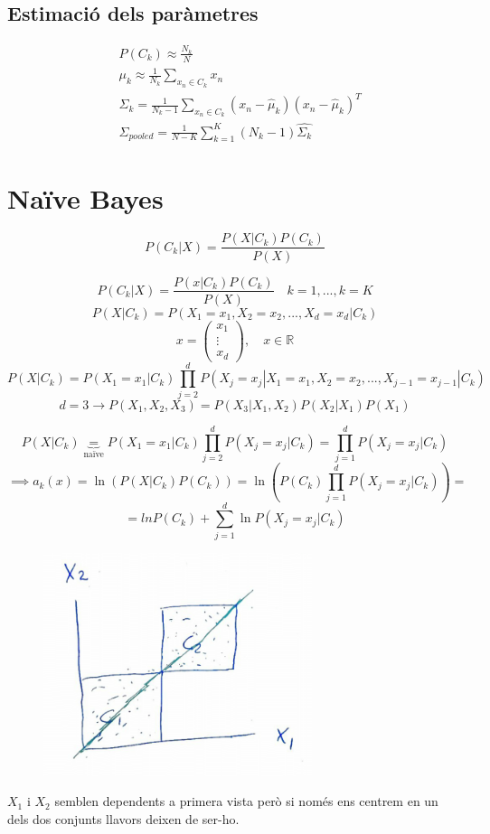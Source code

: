 \documentclass[a4paper]{article}
\begin{document}
\subsection{Estimació dels paràmetres}

\begin{align*}
&	P(C_k) \approx \frac{N_k}{N} \\
&	\mu_k \approx \frac{1}{N_k} \sum_{x_n \in C_k} x_n \\
&	\Sigma_k = \frac{1}{N_k - 1} \sum_{x_n \in C_k} (x_n - \hat{\mu}_k)(x_n - \hat{\mu}_k)^T \\
&	\Sigma_{pooled} = \frac{1}{N - K} \sum_{k=1}^K (N_k - 1) \hat{\Sigma_k}
\end{align*}

\section{Naïve Bayes}
$$
P(C_k|X) = \frac{P(X|C_k)P(C_k)}{P(X)}
$$


$$
P(C_k|X) = \frac{P(x|C_k)P(C_k)}{P(X)} \quad k=1,...,k=K
$$
$$
P(X|C_k) = P(X_1=x_1, X_2=x_2, ..., X_d = x_d|C_k)
$$
$$
x = 
\begin{pmatrix}
x_1 \\ \vdots \\ x_d
\end{pmatrix}, \quad
x \in \mathbb{R}
$$
$$
P(X|C_k) = P(X_1=x_1|C_k)\prod_{j=2}^d P(X_j=x_j|X_1=x_1,X_2=x_2,...,X_{j-1}=x_{j-1}|C_k)
$$
$$
d=3 \rightarrow P(X_1,X_2,X_3) = P(X_3|X_1,X_2)P(X_2|X_1)P(X_1)
$$

$$
P(X|C_k) \underbrace{=}_{\text{naïve}} P(X_1=x_1|C_k) 
\prod_{j=2}^d P(X_j=x_j|C_k) = \prod_{j=1}^d P(X_j=x_j|C_k)
$$
$$
\implies a_k(x) = \ln(P(X|C_k)P(C_k)) = 
\ln\left(P(C_k)\prod_{j=1}^d P(X_j=x_j|C_k)\right) =
$$
$$
= ln P(C_k) + \sum_{j=1}^d \ln P(X_j=x_j|C_k)
$$

\begin{figure}[H]
	\centering
	\includegraphics[width=0.7\textwidth]{images/tema_5-6}
\end{figure}

$X_1$ i $X_2$ semblen dependents a primera vista però si només ens centrem en un dels dos conjunts llavors deixen de ser-ho.
\end{document}
